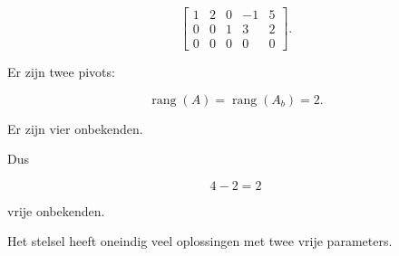 \documentclass{ximera}
\begin{document}
\begin{oefening}{\oefU\ESS}
\begin{question}
\end{question}


\begin{question}

\[
\left[
\begin{array}{cccc|c}
1&2&0&-1&5\\
0&0&1&3&2\\
0&0&0&0&0
\end{array}
\right].
\]

\begin{oplossing}

Er zijn twee pivots:

\[
\operatorname{rang}(A)
=
\operatorname{rang}(A_b)
=
2.
\]

Er zijn vier onbekenden.

Dus

\[
4-2=2
\]

vrije onbekenden.

Het stelsel heeft oneindig veel oplossingen met twee vrije parameters.

\end{oplossing}

\end{question}

\end{oefening}



\end{document}

